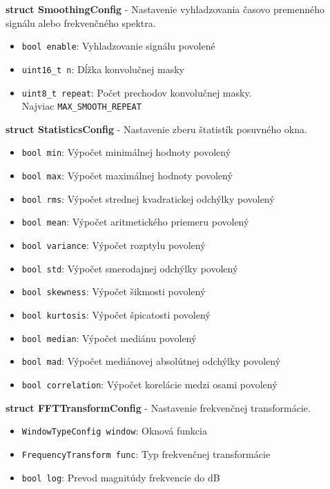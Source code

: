 \noindent\textbf{struct SmoothingConfig} - Nastavenie vyhladzovania časovo premenného signálu alebo frekvenčného spektra.
\begin{itemize}[noitemsep, topsep=0pt]
	\item \verb|bool enable|: Vyhladzovanie signálu povolené
	\item \verb|uint16_t n|: Dĺžka konvolučnej masky
	\item \verb|uint8_t repeat|: Počet prechodov konvolučnej masky.\\ Najviac \verb|MAX_SMOOTH_REPEAT|
\end{itemize}
\bigbreak

\noindent\textbf{struct StatisticsConfig} - Nastavenie zberu štatistík posuvného okna.
\begin{itemize}[noitemsep, topsep=0pt]
	\item \verb|bool min|: Výpočet minimálnej hodnoty povolený
	\item \verb|bool max|: Výpočet maximálnej hodnoty povolený
	\item \verb|bool rms|: Výpočet strednej kvadratickej odchýlky povolený
	\item \verb|bool mean|: Výpočet aritmetického priemeru povolený
	\item \verb|bool variance|: Výpočet rozptylu povolený
	\item \verb|bool std|: Výpočet smerodajnej odchýlky povolený
	\item \verb|bool skewness|: Výpočet šikmosti povolený
	\item \verb|bool kurtosis|: Výpočet špicatosti povolený
	\item \verb|bool median|: Výpočet mediánu povolený
	\item \verb|bool mad|: Výpočet mediánovej absolútnej odchýlky povolený
	\item \verb|bool correlation|: Výpočet korelácie medzi osami povolený
\end{itemize}
\bigbreak

\noindent\textbf{struct FFTTransformConfig} - Nastavenie frekvenčnej transformácie.
\begin{itemize}[noitemsep, topsep=0pt]
	\item \verb|WindowTypeConfig window|: Oknová funkcia
	\item \verb|FrequencyTransform func|: Typ frekvenčnej transformácie
	\item \verb|bool log|: Prevod magnitúdy frekvencie do dB
\end{itemize}
\bigbreak

